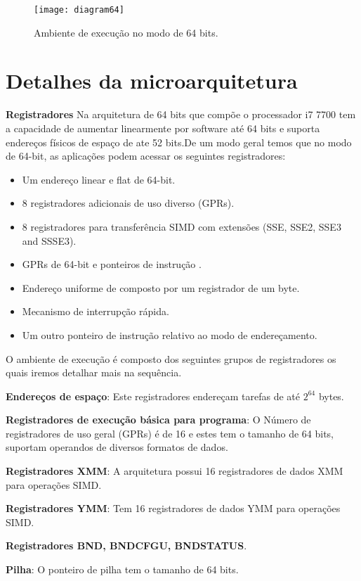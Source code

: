 \documentclass[12pt,a4paper,brazilian,utf8]{ppgsi}
\begin{document}
    \begin{figure}[H]
		\centering
		\caption{Ambiente de execução no modo de 64 bits.}
		\texttt{[image: diagram64]}
	\end{figure}

\section{Detalhes da microarquitetura}
    \textbf{Registradores}
    Na arquitetura de 64 bits que compõe o processador i7 7700 tem a capacidade de aumentar linearmente por software até 64  bits e suporta endereços físicos de espaço de ate 52 bits.De um modo geral temos que no modo de 64-bit, as aplicações podem acessar os seguintes registradores:
    \begin{itemize}
		\item Um endereço linear e flat de 64-bit.
        \item 8 registradores adicionais de uso diverso (GPRs).
        \item 8 registradores para transferência SIMD com extensões (SSE, SSE2, SSE3 and SSSE3).
        \item GPRs de 64-bit e ponteiros de instrução .
        \item Endereço uniforme de composto por um registrador de um byte.
        \item Mecanismo de interrupção rápida.
        \item Um outro ponteiro de instrução relativo ao modo de endereçamento.
    \end{itemize}
    O ambiente de execução é composto dos seguintes grupos de registradores os quais iremos detalhar mais na sequência.
    
    \textbf{Endereços de espaço}: Este registradores endereçam tarefas de até $2^{64}$ bytes.
    
    \textbf{Registradores de execução básica para programa}: O Número de registradores de uso geral (GPRs) é de 16 e estes tem o tamanho de 64 bits, suportam operandos de diversos formatos de dados.
    
    \textbf{Registradores XMM}: A arquitetura possui 16 registradores de dados XMM para operações SIMD.
    
    \textbf{Registradores YMM}: Tem 16 registradores de dados YMM para operações SIMD.
    
    \textbf{Registradores BND, BNDCFGU, BNDSTATUS}.
    
    \textbf{Pilha}: O ponteiro de pilha tem o tamanho de 64 bits.
    
\end{document}
